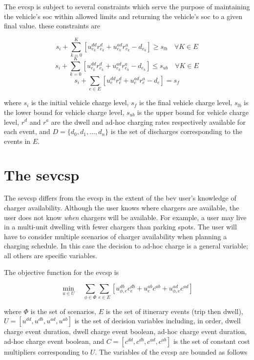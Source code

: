 \documentclass[12pt]{article}
\begin{document}
The \gls{evcsp} is subject to several constraints which serve the purpose of maintaining the vehicle's \gls{soc} within allowed limits and returning the vehicle's \gls{soc} to a given final value. these constraints are

\begin{equation}
	s_i+\sum_{k=0}^{K}[u_{e_k}^{dd}r_{e_k}^{d}+u_{e_k}^{ad}r_{e_k}^{a}-d_{e_k}]\geq s_{lb}\quad \forall K\in E
\end{equation}
\begin{equation}
	s_i+\sum_{k=0}^{K}[u_{e_k}^{dd}r_{e_k}^{d}+u_{e_k}^{ad}r_{e_k}^{a}-d_{e_k}]\leq s_{ub}\quad \forall K\in E
\end{equation}
\begin{equation}
	s_i+\sum_{e\in E}[u_{e}^{dd}r_{e}^{d}+u_{e}^{ad}r_{e}^{a}-d_{e}]=s_f
\end{equation}

where $s_i$ is the initial vehicle charge level, $s_f$ is the final vehicle charge level, $s_{lb}$ is the lower bound for vehicle charge level, $s_{ub}$ is the upper bound for vehicle charge level, $r^d$ and $r^a$ are the dwell and ad-hoc charging rates respectively available for each event, and $D=\{d_0,d_1,\dots,d_n\}$ is the set of discharges corresponding to the events in $E$.

\section*{The \gls{sevcsp}}

The \gls{sevcsp} differs from the \gls{evcsp} in the extent of the \gls{bev} user's knowledge of charger availability. Although the user knows where chargers are available, the user does not know \textit{when} chargers will be available. For example, a user may live in a multi-unit dwelling with fewer chargers than parking spots. The user will have to consider multiple scenarios of charger availability when planning a charging schedule. In this case the decision to ad-hoc charge is a general variable; all others are specific variables.

The objective function for the \gls{evcsp} is

\begin{equation}
	\min_{u\in U}\quad \sum_{\phi\in \Phi}\sum_{e\in E}[u_{\phi,e}^{db}c_{e}^{db}+u_{e}^{ab}c^{ab}+u_{\phi,e}^{ad}c^{ad}] \label{eq:obj_s}
\end{equation}

where $\Phi$ is the set of scenarios, $E$ is the set of itinerary events (trip then dwell), $U=[u^{dd},u^{db},u^{ad},u^{ab}]$ is the set of decision variables including, in order, dwell charge event duration, dwell charge event boolean, ad-hoc charge event duration, ad-hoc charge event boolean, and  $C=[c^{dd},c^{db},c^{ad},c^{ab}]$ is the set of constant cost multipliers corresponding to $U$. The variables of the \gls{evcsp} are bounded as follows
\end{document}
